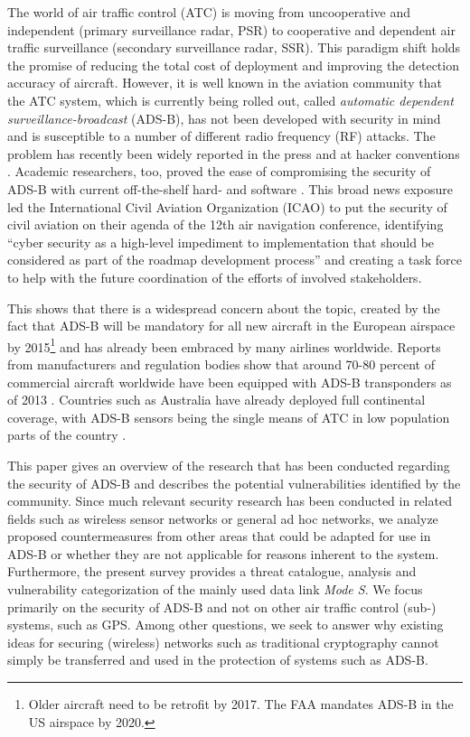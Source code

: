 \documentclass[english]{IEEEtran}
\begin{document}
\thispagestyle{empty}The world of air traffic control (ATC) is moving
from uncooperative and independent (primary surveillance radar, PSR)
to cooperative and dependent air traffic surveillance (secondary surveillance
radar, SSR). This paradigm shift holds the promise of reducing the
total cost of deployment and improving the detection accuracy of aircraft.
However, it is well known in the aviation community that the ATC system,
which is currently being rolled out, called \emph{automatic dependent
surveillance-broadcast} (ADS-B), has not been developed with security
in mind and is susceptible to a number of different radio frequency
(RF) attacks. The problem has recently been widely reported in the
press \cite{NewScientist,CNN,Forbes,Wired,NPR} and at hacker conventions
\cite{Costin,bradhaines2012,defconkunkel}. Academic researchers,
too, proved the ease of compromising the security of ADS-B with current
off-the-shelf hard- and software \cite{schafer2013experimental}.
This broad news exposure led the International Civil Aviation Organization
(ICAO) to put the security of civil aviation on their agenda of the
12th air navigation conference, identifying ``cyber security as a
high-level impediment to implementation that should be considered
as part of the roadmap development process'' \cite{ICAO2012} and
creating a task force to help with the future coordination of the
efforts of involved stakeholders. 

This shows that there is a widespread concern about the topic, created
by the fact that ADS-B will be mandatory for all new aircraft in the
European airspace by 2015\footnote{Older aircraft need to be retrofit by 2017. The FAA mandates ADS-B
in the US airspace by 2020.} and has already been embraced by many airlines worldwide. Reports
from manufacturers and regulation bodies show that around 70-80 percent
of commercial aircraft worldwide have been equipped with ADS-B transponders
as of 2013 \cite{adsbimplementation,airbusstatus}. Countries such
as Australia have already deployed full continental coverage, with
ADS-B sensors being the single means of ATC in low population parts
of the country \cite{cascade}.

This paper gives an overview of the research that has been conducted
regarding the security of ADS-B and describes the potential vulnerabilities
identified by the community. Since much relevant security research
has been conducted in related fields such as wireless sensor networks
or general ad hoc networks, we analyze proposed countermeasures from
other areas that could be adapted for use in ADS-B or whether they
are not applicable for reasons inherent to the system. Furthermore,
the present survey provides a threat catalogue, analysis and vulnerability
categorization of the mainly used data link \textit{Mode S}. We focus
primarily on the security of ADS-B and not on other air traffic control
(sub-)\,systems, such as GPS. Among other questions, we seek to answer
why existing ideas for securing (wireless) networks such as traditional
cryptography cannot simply be transferred and used in the protection
of systems such as ADS-B.
\end{document}
